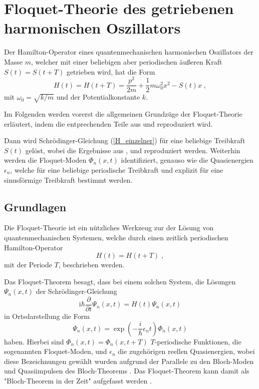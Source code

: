 \chapter{Floquet-Theorie des getriebenen harmonischen Oszillators}
Der Hamilton-Operator eines quantenmechanischen harmonischen Oszillators der Masse $m$, welcher mit einer beliebigen aber periodischen äußeren Kraft $S(t)=S(t+T)$ getrieben wird, hat die Form
\begin{equation}
  H(t) = H(t+T) = \frac{p^2}{2m} + \frac{1}{2}m\omega_0^2x^2-S(t)x \; ,
  \label{H_einzelner}
\end{equation}
mit $\omega_0=\sqrt{k/m}$ und der Potentialkonstante $k$.

Im Folgenden werden vorerst die allgemeinen Grundzüge der Floquet-Theorie erläutert, indem die entprechenden Teile aus \cite{haengi} und \cite{sherly} reproduziert wird.

Dann wird Schrödinger-Gleichung (\ref{H_einzelner}) für eine beliebige Treibkraft $S(t)$ gelöst, wobei die Ergebnisse aus \cite{haengi},\cite{husimi} und \cite{mads} reproduziert werden.
Weiterhin werden die Floquet-Moden $\Phi_n(x,t)$ identifiziert, genauso wie die Quasienergien $\epsilon_n$, welche für eine beliebige periodische Treibkraft und explizit für eine sinusförmige Treibkraft bestimmt werden.
\iffalse
Danach werden wir die Ewartungswerte $\braket{x}_n,\braket{x^2}_n,\braket{p}_n,\braket{p^2}_n$ und damit die Unschärfe berechnen, indem wir die bekannten Erwartungswerte des ungetriebenen Oszillators benutzen.
Ebenso werden wir den zeitabhängigen und gemittelten Erwartungswert der Energie $\braket{H}_n$ und $\bar H_n$ berechnen.
\fi

\section{Grundlagen}
  Die Floquet-Theorie \cite{haengi} ist ein nützliches Werkzeug zur der Lösung von quantenmechanischen Systemen, welche durch einen zeitlich periodischen Hamilton-Operator
  \begin{equation}
    H(t) = H(t+T) \; ,
  \end{equation}
  mit der Periode $T$, beschrieben werden.

  Das Floquet-Theorem besagt, dass bei einem solchen System, die Lösungen $\Psi_n(x,t)$ der Schrödinger-Gleichung
  \begin{equation}
    \text{i}\hbar\frac{\partial}{\partial t}\Psi_n(x,t) = H(t)\Psi_n(x,t)
    \label{schroedinger}
  \end{equation}
  in Ortsdarstellung die Form
  \begin{equation}
    \Psi_n(x,t) = \exp\left(-\frac{i}{\hbar}\epsilon_nt\right)\Phi_n(x,t)
    \label{floquet_theorem}
  \end{equation}
  haben.
  Hierbei sind $\Phi_n(x,t) = \Phi_n(x,t+T)$ $T$-periodische Funktionen, die sogenannten Floquet-Moden, und $\epsilon_n$ die zugehörigen reellen Quasienergien, wobei diese Bezeichnungen gewählt wurden aufgrund der Parallele zu den Bloch-Moden und Quasiimpulsen des Bloch-Theorems \cite{haengi}.
  Das Floquet-Theorem kann damit als "Bloch-Theorem in der Zeit" aufgefasst werden \cite{sherly}.

